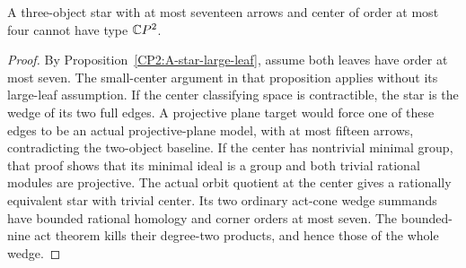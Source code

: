 \begin{corollary}
\label{CP2:A-star-small-center}
A three-object star with at most seventeen arrows and center
of order at most four cannot have type $\mathbb{C}P^2$.
\end{corollary}
\begin{proof}
By Proposition~\ref{CP2:A-star-large-leaf}, assume both
leaves have order at most seven. The small-center argument
in that proposition applies without its large-leaf
assumption. If the center classifying space is contractible,
the star is the wedge of its two full edges. A projective
plane target would force one of these edges to be an actual
projective-plane model, with at most fifteen arrows,
contradicting the two-object baseline. If the center has
nontrivial minimal group, that proof shows that its minimal
ideal is a group and both trivial rational modules are
projective. The actual orbit quotient at the center gives
a rationally equivalent star with trivial center. Its two
ordinary act-cone wedge summands have bounded rational
homology and corner orders at most seven. The bounded-nine
act theorem kills their degree-two products, and hence
those of the whole wedge.
\end{proof}

